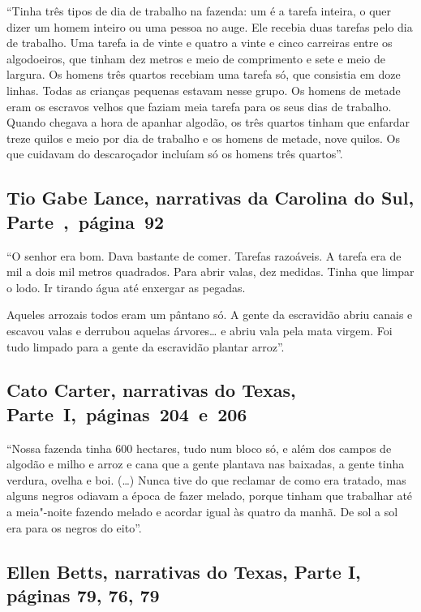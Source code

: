 ``Tinha três tipos de dia de trabalho na fazenda: um é a tarefa inteira,
o quer dizer um homem inteiro ou uma pessoa no auge. Ele recebia duas %
tarefas pelo dia de trabalho. Uma tarefa ia de vinte e quatro a vinte e
cinco carreiras entre os algodoeiros, que tinham dez metros e meio de
comprimento e sete e meio de largura. Os homens três quartos recebiam
uma tarefa só, que consistia em doze linhas. Todas as crianças pequenas
estavam nesse grupo. Os homens de metade eram os escravos velhos que
faziam meia tarefa para os seus dias de trabalho. Quando chegava a hora
de apanhar algodão, os três quartos tinham que enfardar treze quilos e
meio por dia de trabalho e os homens de metade, nove quilos. Os que
cuidavam do descaroçador incluíam só os homens três quartos''.

\subsection{Tio Gabe Lance, narrativas da Carolina do Sul, Parte~,~página~92}
\label{ref168}

``O senhor era bom. Dava bastante de comer. Tarefas razoáveis. A tarefa
era de mil a dois mil metros quadrados. Para abrir valas, dez medidas.
Tinha que limpar o lodo. Ir tirando água até enxergar as pegadas.

Aqueles arrozais todos eram um pântano só. A gente da escravidão abriu
canais e escavou valas e derrubou aquelas árvores\ldots{} e abriu vala
pela mata virgem. Foi tudo limpado para a gente da escravidão plantar
arroz''.

\subsection{Cato Carter, narrativas do Texas, Parte~I,~páginas~204~e~206} \label{ref51}

``Nossa fazenda tinha 600 hectares, tudo num bloco só, e além dos campos
de algodão e milho e arroz e cana que a gente plantava nas baixadas, a
gente tinha verdura, ovelha e boi. (\ldots{}) Nunca tive do que reclamar
de como era tratado, mas alguns negros odiavam a época de fazer melado,
porque tinham que trabalhar até a meia"-noite fazendo melado e acordar
igual às quatro da manhã. De sol a sol era para os negros do eito''.

\subsection{Ellen Betts, narrativas do Texas, Parte I, páginas 79, 76, 79} \label{ref25}

